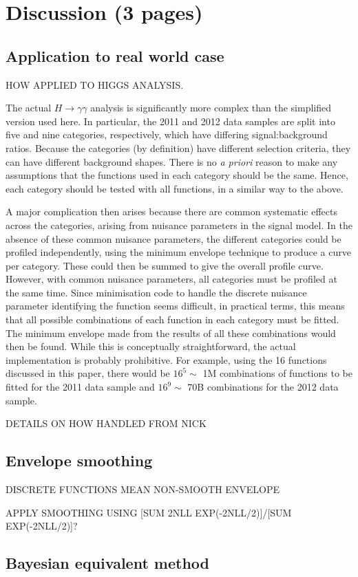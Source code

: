 \section{Discussion (3 pages)}
\label{sec:discussion}

\subsection{Application to real world case}
\label{sec:discussion:higgs}

HOW APPLIED TO HIGGS ANALYSIS.

The actual $H \rightarrow \gamma\gamma$ analysis is significantly more
complex than the simplified version used here. In particular, the 2011 
and 2012 data
samples are split into five and nine categories, respectively, which have
differing signal:background ratios.
Because the categories (by definition) have different selection criteria,
they can have different background shapes.
There is no {\it a priori} reason to make any assumptions that the functions
used in each category should be the same. Hence, each category should be
tested with all functions, in a similar way to the above.

A major complication then arises because there are common systematic effects
across the categories, arising from nuisance parameters in the signal
model.
In the absence of these common nuisance parameters,
the different categories could be profiled independently, using the
minimum envelope technique to produce a curve per category. These could then
be summed to give the overall profile curve. However, with common
nuisance parameters, all categories must be profiled at the same time.
Since minimisation code to handle the 
discrete nuisance parameter identifying the
function seems difficult, in practical terms, this means that all possible
combinations of each function in each category must be fitted.
The minimum envelope made from the results of all these combinations would
then be found. While this is conceptually straightforward, the actual
implementation is probably prohibitive. For example, using the 16 functions
discussed in this paper, there would be $16^5 \sim$ 1M combinations of functions
to be fitted for the 2011 data sample and $16^9 \sim$ 70B combinations for the
2012 data sample.

DETAILS ON HOW HANDLED FROM NICK

\subsection{Envelope smoothing}
\label{sec:discussion:smoothing}

DISCRETE FUNCTIONS MEAN NON-SMOOTH ENVELOPE

APPLY SMOOTHING USING [SUM 2NLL EXP(-2NLL/2)]/[SUM EXP(-2NLL/2)]?


\subsection{Bayesian equivalent method}
\label{sec:discussion:bayesian}
